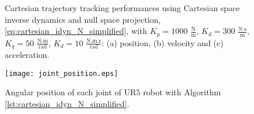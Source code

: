 \begin{figure}%
	\centering
	\caption{Cartesian trajectory tracking performances using Cartesian space inverse dynamics and null space projection, \eqref{eq:cartesian_idyn_N_simplified}, with  ${K_{p}}=1000$ $\mathrm{\frac{N}{m}}$, $K_{d}= 300$ $\mathrm{\frac{N.s}{m}}$, ${K_{q}}=50$ $\mathrm{\frac{N.m}{rad}}$, $K_{d}= 10$ $\mathrm{\frac{N.m.s}{rad}}$: (a) position, (b) velocity and (c) acceleration.}
	\label{fig:act_2.2_ee_position}
\end{figure}

\begin{figure}
    \centering
    \texttt{[image: joint\_position.eps]}	
    \caption{Angular position of each joint of UR5 robot with Algorithm \ref{lst:cartesian_idyn_N_simplified}.}
    \label{fig:act_2.2_joint_position}
\end{figure}